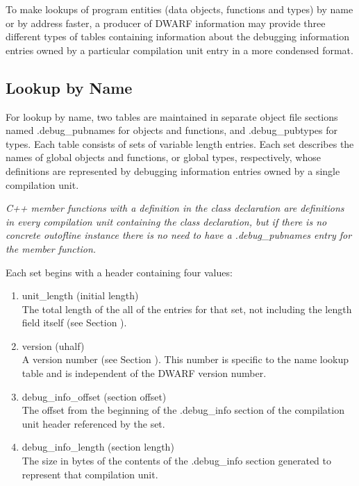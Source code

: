 To make lookups of program entities (data objects, functions
and types) by name or by address faster, a producer of DWARF
information may provide three different types of tables
containing information about the debugging information
entries owned by a particular compilation unit entry in a
more condensed format.

\subsection{Lookup by Name}

For lookup by name, two tables are maintained in separate
object file sections named .debug\_pubnames for objects and
functions, and .debug\_pubtypes for types. Each table consists
of sets of variable length entries. Each set describes the
names of global objects and functions, or global types,
respectively, whose definitions are represented by debugging
information entries owned by a single compilation unit.

\textit{C++ member functions with a definition in the class declaration
are definitions in every compilation unit containing the
class declaration, but if there is no concrete out\dash of\dash line
instance there is no need to have a .debug\_pubnames entry
for the member function.}

Each set begins with a header containing four values:
\begin{enumerate}[1.]

\item unit\_length (initial length) \\
The total length of the all of the entries for that set,
not including the length field itself 
(see Section ).

\item  version (uhalf) \\
A version number 
(see Section ). 
This number is specific
to the name lookup table and is independent of the DWARF
version number.

\item debug\_info\_offset (section offset) \\
The offset from the beginning of the .debug\_info section of
the compilation unit header referenced by the set.

\item debug\_info\_length (section length) \\
The size in bytes of the contents of the .debug\_info section
generated to represent that compilation unit.
\end{enumerate}

